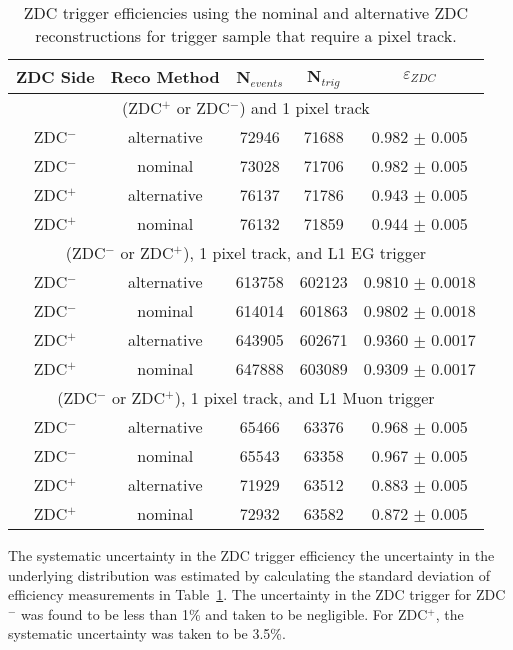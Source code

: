     \begin{table}
      \centering
      \begin{tabular}{|c|c|c|c|c|}
        \hline ZDC Side & Reco Method & N$_{events}$ & N$_{trig}$ & $\varepsilon_{ZDC}$ \\ \hline
         \multicolumn{5}{|c|}{(ZDC$^{+}$ or ZDC$^{-}$) and 1 pixel track} \\ \hline 
         ZDC$^{-}$ & alternative & 72946  & 71688 & 0.982 $\pm$ 0.005 \\ \hline
         ZDC$^{-}$ & nominal & 73028  & 71706  & 0.982  $\pm$ 0.005  \\ \hline
         ZDC$^{+}$ & alternative & 76137  & 71786  & 0.943  $\pm$ 0.005  \\ \hline
         ZDC$^{+}$ & nominal & 76132  & 71859  & 0.944  $\pm$ 0.005  \\ \hline
         \multicolumn{5}{|c|}{(ZDC$^{-}$ or ZDC$^{+}$), 1 pixel track, and L1 EG trigger } \\ \hline 
         ZDC$^{-}$ & alternative & 613758  & 602123  & 0.9810 $\pm$ 0.0018 \\ \hline
         ZDC$^{-}$ & nominal & 614014  & 601863  & 0.9802 $\pm$ 0.0018 \\ \hline
         ZDC$^{+}$ & alternative & 643905  & 602671  & 0.9360  $\pm$ 0.0017 \\ \hline
         ZDC$^{+}$ & nominal & 647888  & 603089  & 0.9309  $\pm$ 0.0017 \\ \hline
         \multicolumn{5}{|c|}{(ZDC$^{-}$ or ZDC$^{+}$), 1 pixel track, and L1 Muon trigger} \\ \hline 
         ZDC$^{-}$ & alternative & 65466  & 63376  & 0.968 $\pm$ 0.005  \\ \hline
         ZDC$^{-}$ & nominal & 65543  & 63358  & 0.967 $\pm$ 0.005 \\ \hline
         ZDC$^{+}$ & alternative & 71929  & 63512  & 0.883  $\pm$ 0.005 \\ \hline
         ZDC$^{+}$ & nominal & 72932  & 63582  & 0.872  $\pm$ 0.005 \\ \hline
       \end{tabular}
      \caption{ZDC trigger efficiencies using  the nominal and alternative 
        ZDC reconstructions for trigger sample that require a pixel track.}
      \label{tab:zdcEfficiencySys}
    \end{table}

    The systematic uncertainty in the ZDC trigger efficiency \DIFdelbegin {}\DIFdelend \DIFaddbegin {}\DIFaddend the 
      uncertainty in the underlying distribution was estimated by calculating 
      the standard deviation of efficiency measurements in Table~\ref{tab:zdcEfficiencySys}.
    The uncertainty in the ZDC trigger for ZDC$^{-}$ was found to be less than 
      1\% and taken to be negligible. 
    For ZDC$^{+}$, the systematic uncertainty was taken to be 3.5\%.


